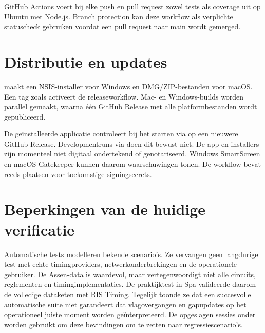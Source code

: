 GitHub Actions voert bij elke push en pull request zowel tests als coverage uit op Ubuntu met
Node.js. Branch protection kan deze workflow als verplichte statuscheck gebruiken voordat een pull
request naar main wordt gemerged.

\section{Distributie en updates}
 maakt een NSIS-installer voor Windows en DMG/ZIP-bestanden voor macOS. Een
tag zoals  activeert de releaseworkflow. Mac- en Windows-builds worden parallel
gemaakt, waarna één GitHub Release met alle platformbestanden wordt gepubliceerd.

De geïnstalleerde applicatie controleert bij het starten via  op een nieuwere
GitHub Release. Developmentruns via  doen dit bewust niet. De app en installers zijn
momenteel niet digitaal ondertekend of genotariseerd. Windows SmartScreen en macOS Gatekeeper kunnen
daarom waarschuwingen tonen. De workflow bevat reeds plaatsen voor toekomstige signingsecrets.

\section{Beperkingen van de huidige verificatie}
Automatische tests modelleren bekende scenario's. Ze vervangen geen langdurige test met echte
timingproviders, netwerkonderbrekingen en de operationele gebruiker. De Assen-data is waardevol,
maar vertegenwoordigt niet alle circuits, reglementen en timingimplementaties. De praktijktest in
Spa valideerde daarom de volledige dataketen met RIS Timing. Tegelijk toonde ze dat een succesvolle
automatische suite niet garandeert dat vlagovergangen en gapupdates op het operationeel juiste
moment worden geïnterpreteerd. De opgeslagen sessies onder  worden gebruikt om deze
bevindingen om te zetten naar regressiescenario's.
